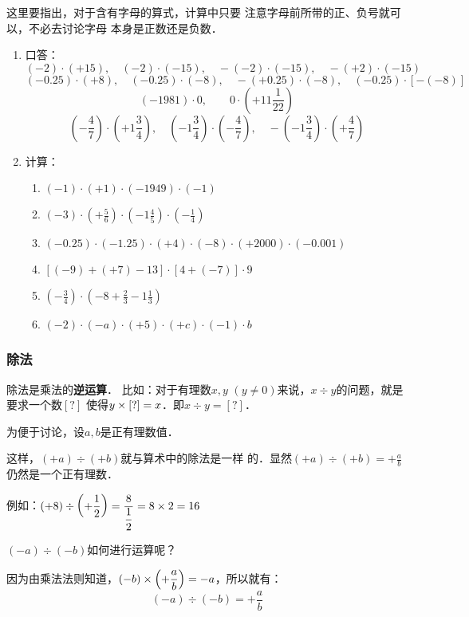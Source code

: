 这里要指出，对于含有字母的算式，计算中只要
注意字母前所带的正、负号就可以，不必去讨论字母
本身是正数还是负数．

\begin{ex}
\begin{enumerate}
    \item 口答：
    \[(-2)\cdot (+15),\quad (-2)\cdot (-15),\quad -(-2)\cdot (-15),\quad -(+2)\cdot (-15)\]
\[(-0.25)\cdot (+8),\quad (-0.25)\cdot (-8),\quad -(+0.25)\cdot (-8),\quad(-0.25)\cdot [-(-8)] \]
\[(-1981)\cdot 0,\qquad 0\cdot\left(+11\frac{1}{22}\right)\]
\[\left(-\frac{4}{7}\right)\cdot \left(+1\frac{3}{4}\right),\quad \left(-1\frac{3}{4}\right)\cdot\left(-\frac{4}{7}\right),\quad -\left(-1\frac{3}{4}\right)\cdot\left(+\frac{4}{7}\right)\]

\item 计算：
\begin{enumerate}
    \item $(-1)\cdot(+1)\cdot (-1949)\cdot (-1)$
    \item $(-3)\cdot \left(+\frac{5}{6}\right)\cdot \left(-1\frac{4}{5}\right)\cdot\left(-\frac{1}{4}\right)$
    \item $(-0.25)\cdot (-1.25)\cdot (+4)\cdot (-8)\cdot (+2000)\cdot (-0.001)$
    \item $[(-9)+(+7)-13]\cdot [4+(-7)]\cdot 9$
    \item $\left(-\frac{3}{4}\right)\cdot \left(-8+\frac{2}{3}-1\frac{1}{3}\right)$
    \item $(-2)\cdot (-a)\cdot (+5)\cdot (+c)\cdot (-1)\cdot b$
\end{enumerate}
\end{enumerate}    
\end{ex}

\subsubsection{除法}
除法是乘法的\textbf{逆运算}． 比如：对于有理数$x,  y$
 $(y\ne 0)$来说，$x\div y$的问题，就是要求一个数$[?]$
使得$y\times[?]=x$．即$x\div y=[?]$．

为便于讨论，设$a,b$是正有理数值．

这样，$(+a) \div (+b)$就与算术中的除法是一样
的．显然$(+a)\div (+b)=+\frac{a}{b}$仍然是一个正有理数．
                    
例如：$(+8)\div\left(+\dfrac{1}{2}\right)=\dfrac{8}{\dfrac{1}{2}}=8\times 2=16$

$(-a) \div (-b)$如何进行运算呢？

因为由乘法法则知道，$(-b)\times \left(+\dfrac{a}{b}\right)=-a$，所以就有：
\[(-a) \div (-b)=+\frac{a}{b}\]

